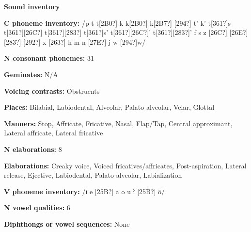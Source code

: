 \begin{styleBody}
\textbf{Sound inventory}
\end{styleBody}

\begin{styleBody}
\textbf{C phoneme inventory:} /p t t[2B0?] k k[2B0?] k[2B7?] [294?] t’ k’ t[361?]s t[361?][26C?] t[361?][283?] t[361?]s’ t[361?][26C?]’ t[361?][283?]’ f s z [26C?] [26E?] [283?] [292?] x [263?] h m n [27E?] j w [294?]w/
\end{styleBody}

\begin{styleBody}
\textbf{N consonant phonemes:} 31
\end{styleBody}

\begin{styleBody}
\textbf{Geminates:} N/A
\end{styleBody}

\begin{styleBody}
\textbf{Voicing contrasts:} Obstruents
\end{styleBody}

\begin{styleBody}
\textbf{Places:} Bilabial, Labiodental, Alveolar, Palato-alveolar, Velar, Glottal
\end{styleBody}

\begin{styleBody}
\textbf{Manners:} Stop, Affricate, Fricative, Nasal, Flap/Tap, Central approximant, Lateral affricate, Lateral fricative
\end{styleBody}

\begin{styleBody}
\textbf{N elaborations:} 8
\end{styleBody}

\begin{styleBody}
\textbf{Elaborations:} Creaky voice, Voiced fricatives/affricates, Post-aspiration, Lateral release, Ejective, Labiodental, Palato-alveolar, Labialization
\end{styleBody}

\begin{styleBody}
\textbf{V phoneme inventory:} /i e [25B?] a o u \~{i} [25B?] \~{o}/
\end{styleBody}

\begin{styleBody}
\textbf{N vowel qualities:} 6
\end{styleBody}

\begin{styleBody}
\textbf{Diphthongs or vowel sequences:} None
\end{styleBody}

